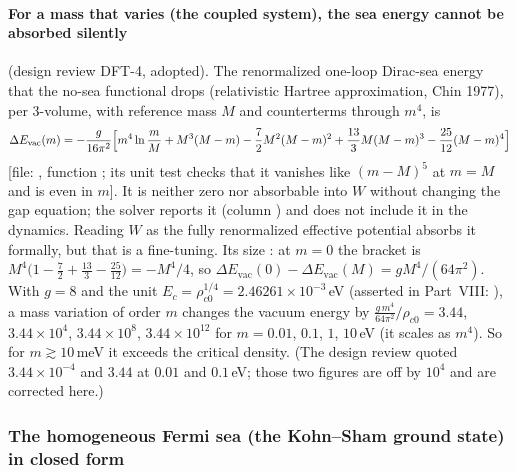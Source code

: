 \paragraph{For a mass that varies (the coupled system), the sea energy cannot be absorbed silently}
(design review DFT-4, adopted). The renormalized one-loop Dirac-sea energy that the no-sea functional
drops (relativistic Hartree approximation, Chin 1977), per 3-volume, with reference mass $M$ and
counterterms through $m^4$, is
\[
  \Delta E_{\mathrm{vac}}(m)=-\frac{g}{16\pi^2}\Bigl[m^4\ln\frac mM+M^3(M-m)-\frac72M^2(M-m)^2+\frac{13}{3}M(M-m)^3-\frac{25}{12}(M-m)^4\Bigr]
\]
[file: , function ;
its unit test  checks that it
vanishes like $(m-M)^5$ at $m=M$ and is even in $m$]. It is neither zero nor absorbable into $W$
without changing the gap equation; the solver reports it (column ) and does not
include it in the dynamics. Reading $W$ as the fully renormalized effective potential absorbs it
formally, but that is a fine-tuning. Its size \cfderived: at $m=0$ the bracket is
$M^4\bigl(1-\frac72+\frac{13}{3}-\frac{25}{12}\bigr)=-M^4/4$, so
$\Delta E_{\mathrm{vac}}(0)-\Delta E_{\mathrm{vac}}(M)=gM^4/(64\pi^2)$. With $g=8$ and the unit
$E_c=\rho_{c0}^{1/4}=2.46261\times10^{-3}$\,eV (asserted in Part~VIII:
), a mass variation of order $m$ changes the vacuum energy by
$\frac{g\,m^4}{64\pi^2}\big/\rho_{c0}=3.44$, $3.44\times10^{4}$, $3.44\times10^{8}$,
$3.44\times10^{12}$ for $m=0.01$, $0.1$, $1$, $10$\,eV (it scales as $m^4$). So for
$m\gtrsim10$\,meV it exceeds the critical density. (The design review quoted $3.44\times10^{-4}$ and
$3.44$ at $0.01$ and $0.1$\,eV; those two figures are off by $10^4$ and are corrected here.)

\subsubsection{The homogeneous Fermi sea (the Kohn--Sham ground state) in closed form}
\label{sec:3.7.4}

